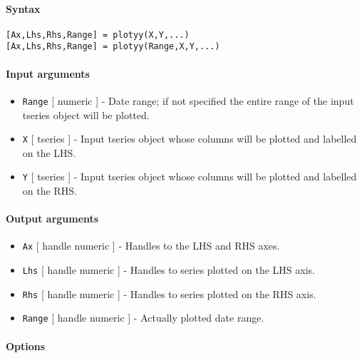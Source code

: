 


	\paragraph{Syntax}\label{syntax}

\begin{verbatim}
[Ax,Lhs,Rhs,Range] = plotyy(X,Y,...)
[Ax,Lhs,Rhs,Range] = plotyy(Range,X,Y,...)
\end{verbatim}

\paragraph{Input arguments}\label{input-arguments}

\begin{itemize}
\item
  \texttt{Range} {[} numeric {]} - Date range; if not specified the
  entire range of the input tseries object will be plotted.
\item
  \texttt{X} {[} tseries {]} - Input tseries object whose columns will
  be plotted and labelled on the LHS.
\item
  \texttt{Y} {[} tseries {]} - Input tseries object whose columns will
  be plotted and labelled on the RHS.
\end{itemize}

\paragraph{Output arguments}\label{output-arguments}

\begin{itemize}
\item
  \texttt{Ax} {[} handle \textbar{} numeric {]} - Handles to the LHS and
  RHS axes.
\item
  \texttt{Lhs} {[} handle \textbar{} numeric {]} - Handles to series
  plotted on the LHS axis.
\item
  \texttt{Rhs} {[} handle \textbar{} numeric {]} - Handles to series
  plotted on the RHS axis.
\item
  \texttt{Range} {[} handle \textbar{} numeric {]} - Actually plotted
  date range.
\end{itemize}

\paragraph{Options}\label{options}

